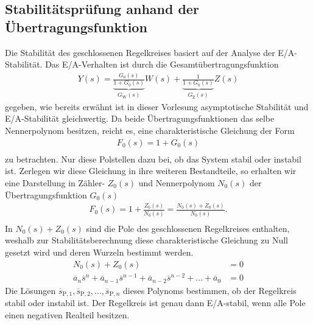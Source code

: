 \subsection{Stabilitätsprüfung anhand der Übertragungsfunktion \cite{Lunze10}}
%
Die Stabilität des geschlossenen Regelkreises basiert auf der Analyse der E/A-Stabilität. Das E/A-Verhalten ist durch die Gesamtübertragungsfunktion
%
\begin{equation*}
\begin{aligned}
%
Y(s)=\underbrace{\frac{G_{0}(s)}{1+G_{0}(s)}}_{G_{\text{W}}(s)}W(s)+\underbrace{\frac{1}{1+G_{0}(s)}}_{G_{\text{Z}}(s)}Z(s)
%
\end{aligned}
\end{equation*}   
%
gegeben, wie bereits erwähnt ist in dieser Vorlesung asymptotische Stabilität und E/A-Stabilität gleichwertig. Da beide Übertragungsfunktionen das selbe Nennerpolynom besitzen, reicht es, eine charakteristische Gleichung der Form
%
\begin{equation*}
\begin{aligned}
%
F_{0}(s)=1+G_{0}(s)\\
%
\end{aligned}
\end{equation*}
%
zu betrachten. Nur diese Polstellen dazu bei, ob das System stabil oder instabil ist. Zerlegen wir diese Gleichung in ihre weiteren Bestandteile, so erhalten wir eine Darstellung in Zähler- $Z_{0}(s)$ und Nennerpolynom $N_{0}(s)$ der Übertragungsfunktion $G_{0}(s)$
%
\begin{equation*}
\begin{aligned}
%
F_{0}(s)=1+\frac{Z_{0}(s)}{N_{0}(s)}=\frac{N_{0}(s)+Z_{0}(s)}{N_{0}(s)}.\\
%
\end{aligned}
\end{equation*}
%
In $N_{0}(s)+Z_{0}(s)$ sind die Pole des geschlossenen Regelkreises enthalten, weshalb zur Stabilitätsberechnung diese charakteristische Gleichung zu Null gesetzt wird und deren Wurzeln bestimmt werden.
%
\begin{equation*}
\begin{aligned}
%
N_{0}(s)+Z_{0}(s)&=0\\
%
\overline{a}_{n}\overline{s}^{n}+\overline{a}_{n-1}\overline{s}^{n-1}+\overline{a}_{n-2}\overline{s}^{n-2}+\dots+\overline{a}_{0}&=0
%
\end{aligned}
\end{equation*}
%
Die Lösungen $\overline{s}_{\text{P},1},\overline{s}_{\text{P},2},...,\overline{s}_{\text{P},n}$ dieses Polynoms bestimmen, ob der Regelkreis stabil oder instabil ist. Der Regelkreis ist genau dann E/A-stabil, wenn alle Pole einen negativen Realteil besitzen.
